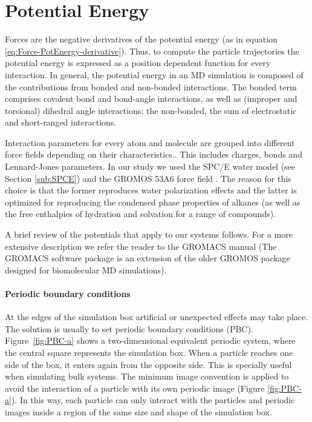 \section{Potential Energy}

Forces are the negative derivatives of the potential energy (as in
equation \ref{eq:Force-PotEnergy-derivative}). Thus, to compute the
particle trajectories the potential energy is expressed as a position
dependent function for every interaction. In general, the potential
energy in an MD simulation is composed of the contributions from bonded
and non-bonded interactions. The bonded term comprises covalent bond
and bond-angle interactions, as well as (improper and torsional) dihedral
angle interactions; the non-bonded, the sum of electrostatic and short-ranged
interactions.

Interaction parameters for every atom and molecule are grouped into
different force fields depending on their characteristics.. This includes
charges, bonds and Lennard-Jones parameters. In our study we used
the SPC/E water model (see Section \ref{sub:SPCE}) and the GROMOS
53A6 force field \cite{oostenbrink:2004,oostenbrink:2005}. The reason
for this choice is that the former reproduces water polarization effects
and the latter is optimized for reproducing the condensed phase properties
of alkanes (as well as the free enthalpies of hydration and solvation
for a range of compounds).

A brief review of the potentials that apply to our systems follows.
For a more extensive description we refer the reader to the GROMACS
manual \cite{spoel:2010} (The GROMACS software package is an extension
of the older GROMOS package \cite{scott:1999} designed for biomolecular
MD simulations).

\paragraph{Periodic boundary conditions}

At the edges of the simulation box artificial or unexpected effects
may take place. The solution is usually to set periodic boundary conditions
(PBC). Figure~\ref{fig:PBC-a} shows a two-dimensional equivalent
periodic system, where the central square represents the simulation
box. When a particle reaches one side of the box, it enters again
from the opposite side. This is specially useful when simulating bulk
systems. The minimum image convention is applied to avoid the interaction
of a particle with its own periodic image (Figure \ref{fig:PBC-a}).
In this way, each particle can only interact with the particles and
periodic images inside a region of the same size and shape of the
simulation box.

